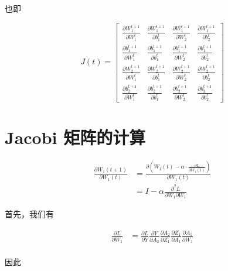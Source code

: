 \documentclass[12pt,a4paper]{amsart}
\begin{document}
也即

\begin{equation}
	J(t) = \begin{bmatrix}
		\frac{\partial W_1^{t+1}}{\partial W_1^t} & \frac{\partial W_1^{t+1}}{\partial b_1^t} & \frac{\partial W_1^{t+1}}{\partial W_2^t} & \frac{\partial W_1^{t+1}}{\partial b_2^t} \\
		\frac{\partial b_1^{t+1}}{\partial W_1^t} & \frac{\partial b_1^{t+1}}{\partial b_1^t} & \frac{\partial b_1^{t+1}}{\partial W_2^t} & \frac{\partial b_1^{t+1}}{\partial b_2^t} \\
		\frac{\partial W_2^{t+1}}{\partial W_1^t} & \frac{\partial W_2^{t+1}}{\partial b_1^t} & \frac{\partial W_2^{t+1}}{\partial W_2^t} & \frac{\partial W_2^{t+1}}{\partial b_2^t} \\
		\frac{\partial b_2^{t+1}}{\partial W_1^t} & \frac{\partial b_2^{t+1}}{\partial b_1^t} & \frac{\partial b_2^{t+1}}{\partial W_2^t} & \frac{\partial b_2^{t+1}}{\partial b_2^t}
	\end{bmatrix}
\end{equation}

\section{Jacobi 矩阵的计算}

\begin{equation}
	\begin{aligned}
		\frac{\partial W_1(t+1)}{\partial W_1(t)} & = \frac{\partial (W_1(t) - \alpha \cdot \frac{\partial L}{\partial W_1(t)})}{\partial W_1(t)} \\
		& = I - \alpha \frac{\partial^2 L}{\partial W_1 \partial W_1}
	\end{aligned}
\end{equation}

首先，我们有

\begin{equation}
	\begin{aligned}
		\frac{\partial L}{\partial W_1} & = \frac{\partial L}{\partial Y} \frac{\partial Y}{\partial A_2} \frac{\partial A_2}{\partial Z_1} \frac{\partial Z_1}{\partial A_1} \frac{\partial A_1}{\partial W_1} \\
	\end{aligned}
\end{equation}

因此
\end{document}
